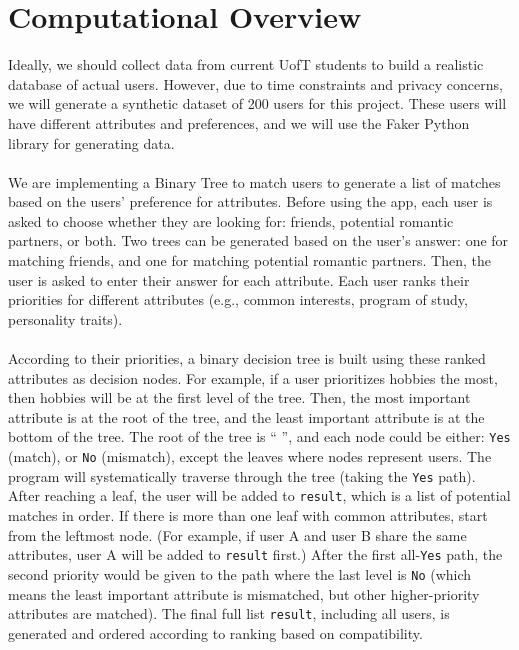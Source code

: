 \documentclass[fontsize=11pt]{article}
\begin{document}
\section*{Computational Overview}

Ideally, we should collect data from current UofT students to build a realistic database of actual users.
However, due to time constraints and privacy concerns, we will generate a synthetic dataset of 200 users for this project.
These users will have different attributes and preferences, and we will use the Faker Python library for generating data.
\\
\\
We are implementing a Binary Tree to match users to generate a list of matches based on the users’ preference for attributes.
Before using the app, each user is asked to choose whether they are looking for: friends, potential romantic partners, or both.
Two trees can be generated based on the user’s answer: one for matching friends, and one for matching potential romantic partners.
Then, the user is asked to enter their answer for each attribute.
Each user ranks their priorities for different attributes (e.g., common interests, program of study, personality traits).
\\
\\
According to their priorities, a binary decision tree is built using these ranked attributes as decision nodes.
For example, if a user prioritizes hobbies the most, then hobbies will be at the first level of the tree.
Then, the most important attribute is at the root of the tree, and the least important attribute is at the bottom of the tree.
The root of the tree is “ ”, and each node could be either: \texttt{Yes} (match), or \texttt{No} (mismatch), except the leaves where nodes represent users.
The program will systematically traverse through the tree (taking the \texttt{Yes} path).
After reaching a leaf, the user will be added to \texttt{result}, which is a list of potential matches in order.
If there is more than one leaf with common attributes, start from the leftmost node.
(For example, if user A and user B share the same attributes, user A will be added to \texttt{result} first.)
After the first all-\texttt{Yes} path, the second priority would be given to the path where the last level is \texttt{No}
(which means the least important attribute is mismatched, but other higher-priority attributes are matched).
The final full list \texttt{result}, including all users, is generated and ordered according to ranking based on compatibility.
\\
\end{document}
